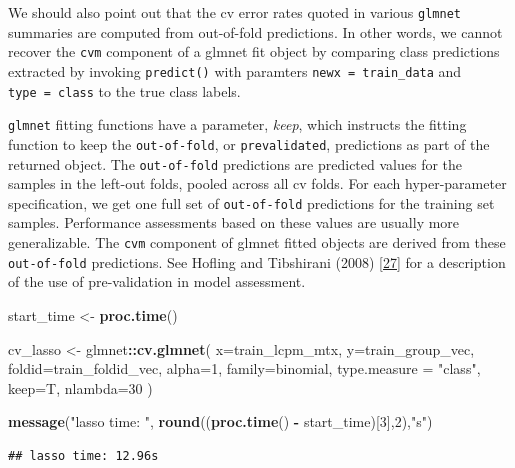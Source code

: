 \documentclass[
]{book}
\newenvironment{Shaded}{\begin{snugshade}}{\end{snugshade}}
\newcommand{\DataTypeTok}[1]{\textcolor[rgb]{0.13,0.29,0.53}{#1}}
\newcommand{\DecValTok}[1]{\textcolor[rgb]{0.00,0.00,0.81}{#1}}
\newcommand{\KeywordTok}[1]{\textcolor[rgb]{0.13,0.29,0.53}{\textbf{#1}}}
\newcommand{\NormalTok}[1]{#1}
\newcommand{\OperatorTok}[1]{\textcolor[rgb]{0.81,0.36,0.00}{\textbf{#1}}}
\newcommand{\StringTok}[1]{\textcolor[rgb]{0.31,0.60,0.02}{#1}}
\begin{document}
We should also point out that the cv error rates quoted in various \texttt{glmnet} summaries
are computed from out-of-fold predictions. In other words,
we cannot recover the \texttt{cvm} component of a glmnet fit object by comparing
class predictions extracted by invoking \texttt{predict()} with paramters \texttt{newx\ =\ train\_data}
and \texttt{type\ =\ \textquotesingle{}class\textquotesingle{}} to the true class labels.

\texttt{glmnet} fitting functions have a
parameter, \emph{keep}, which instructs the fitting function to keep the
\texttt{out-of-fold}, or \texttt{prevalidated}, predictions as part of the returned object. The
\texttt{out-of-fold} predictions are predicted values for the samples in the
left-out folds, pooled across all cv folds. For each hyper-parameter
specification, we get one full set of \texttt{out-of-fold} predictions for
the training set samples. Performance assessments based on these
values are usually more generalizable. The \texttt{cvm} component of glmnet fitted
objects are derived from these \texttt{out-of-fold} predictions.
See Hofling and Tibshirani (2008) {[}\protect\hyperlink{ref-Hofling:2008aa}{27}{]}
for a description of the use of pre-validation in model assessment.

\begin{Shaded}
\begin{Highlighting}[]
\NormalTok{start\_time <{-}}\StringTok{  }\KeywordTok{proc.time}\NormalTok{()}

\NormalTok{cv\_lasso <{-}}\StringTok{ }\NormalTok{glmnet}\OperatorTok{::}\KeywordTok{cv.glmnet}\NormalTok{(}
 \DataTypeTok{x=}\NormalTok{train\_lcpm\_mtx,}
 \DataTypeTok{y=}\NormalTok{train\_group\_vec,}
 \DataTypeTok{foldid=}\NormalTok{train\_foldid\_vec,}
 \DataTypeTok{alpha=}\DecValTok{1}\NormalTok{,}
 \DataTypeTok{family=}\StringTok{\textquotesingle{}binomial\textquotesingle{}}\NormalTok{, }
 \DataTypeTok{type.measure =} \StringTok{"class"}\NormalTok{,}
 \DataTypeTok{keep=}\NormalTok{T,}
 \DataTypeTok{nlambda=}\DecValTok{30}
\NormalTok{)}

\KeywordTok{message}\NormalTok{(}\StringTok{"lasso time: "}\NormalTok{, }\KeywordTok{round}\NormalTok{((}\KeywordTok{proc.time}\NormalTok{() }\OperatorTok{{-}}\StringTok{ }\NormalTok{start\_time)[}\DecValTok{3}\NormalTok{],}\DecValTok{2}\NormalTok{),}\StringTok{"s"}\NormalTok{)}
\end{Highlighting}
\end{Shaded}

\begin{verbatim}
## lasso time: 12.96s
\end{verbatim}
\end{document}
